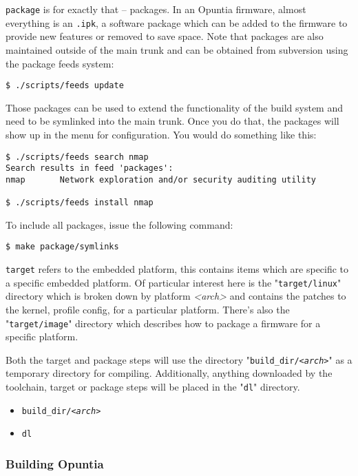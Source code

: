 \texttt{package} is for exactly that -- packages. In an Opuntia firmware, almost everything
is an \texttt{.ipk}, a software package which can be added to the firmware to provide new
features or removed to save space. Note that packages are also maintained outside of the main
trunk and can be obtained from subversion using the package feeds system:

\begin{Verbatim}
$ ./scripts/feeds update
\end{Verbatim}

Those packages can be used to extend the functionality of the build system and need to be
symlinked into the main trunk. Once you do that, the packages will show up in the menu for
configuration. You would do something like this:

\begin{Verbatim}
$ ./scripts/feeds search nmap
Search results in feed 'packages':
nmap       Network exploration and/or security auditing utility

$ ./scripts/feeds install nmap
\end{Verbatim}

To include all packages, issue the following command:

\begin{Verbatim}
$ make package/symlinks
\end{Verbatim}

\texttt{target} refers to the embedded platform, this contains items which are specific to
a specific embedded platform. Of particular interest here is the "\texttt{target/linux}"
directory which is broken down by platform \textit{<arch>} and contains the patches to the
kernel, profile config, for a particular platform. There's also the "\texttt{target/image}" directory
which describes how to package a firmware for a specific platform.

Both the target and package steps will use the directory "\texttt{build\_dir/\textit{<arch>}}"
as a temporary directory for compiling. Additionally, anything downloaded by the toolchain,
target or package steps will be placed in the "\texttt{dl}" directory.

\begin{itemize}
    \item \texttt{build\_dir/\textit{<arch>}}
    \item \texttt{dl}
\end{itemize}

\subsubsection{Building Opuntia}

